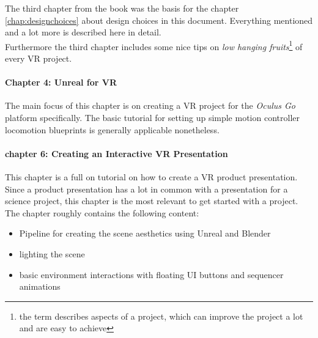 The third chapter from the book was the basis for the chapter \ref{chap:designchoices} about design choices in this document. Everything mentioned and a lot more is described here in detail.\\
Furthermore the third chapter includes some nice tips on \textit{low hanging fruits}\footnote{the term describes aspects of a project, which can improve the project a lot and are easy to achieve} of every VR project. 

\paragraph{Chapter 4: Unreal for VR}

The main focus of this chapter is on creating a VR project for the \textit{Oculus Go} platform specifically. The basic tutorial for setting up simple motion controller locomotion blueprints is generally applicable nonetheless.

\paragraph{chapter 6: Creating an Interactive VR Presentation}

This chapter is a full on tutorial on how to create a VR product presentation. Since a product presentation has a lot in common with a presentation for a science project, this chapter is the most relevant to get started with a project.\\
The chapter roughly contains the following content:
\begin{itemize}
\item Pipeline for creating the scene aesthetics using Unreal and Blender
\item lighting the scene
\item basic environment interactions with floating UI buttons and sequencer animations
\end{itemize}

